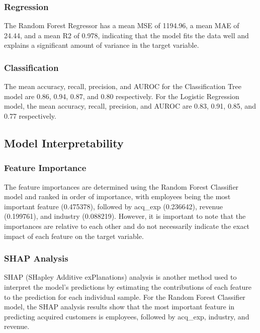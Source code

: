 \hypertarget{regression-1}{%
\subsubsection{Regression}\label{regression-1}}

The Random Forest Regressor has a mean MSE of 1194.96, a mean MAE of
24.44, and a mean R2 of 0.978, indicating that the model fits the data
well and explains a significant amount of variance in the target
variable.

\hypertarget{classification-1}{%
\subsubsection{Classification}\label{classification-1}}

The mean accuracy, recall, precision, and AUROC for the Classification
Tree model are 0.86, 0.94, 0.87, and 0.80 respectively. For the Logistic
Regression model, the mean accuracy, recall, precision, and AUROC are
0.83, 0.91, 0.85, and 0.77 respectively.

\hypertarget{model-interpretability}{%
\subsection{Model Interpretability}\label{model-interpretability}}

\hypertarget{feature-importance}{%
\subsubsection{Feature Importance}\label{feature-importance}}

The feature importances are determined using the Random Forest
Classifier model and ranked in order of importance, with employees being
the most important feature (0.475378), followed by acq\_exp (0.236642),
revenue (0.199761), and industry (0.088219). However, it is important to
note that the importances are relative to each other and do not
necessarily indicate the exact impact of each feature on the target
variable.

\hypertarget{shap-analysis}{%
\subsubsection{SHAP Analysis}\label{shap-analysis}}

SHAP (SHapley Additive exPlanations) analysis is another method used to
interpret the model's predictions by estimating the contributions of
each feature to the prediction for each individual sample. For the
Random Forest Classifier model, the SHAP analysis results show that the
most important feature in predicting acquired customers is employees,
followed by acq\_exp, industry, and revenue.

